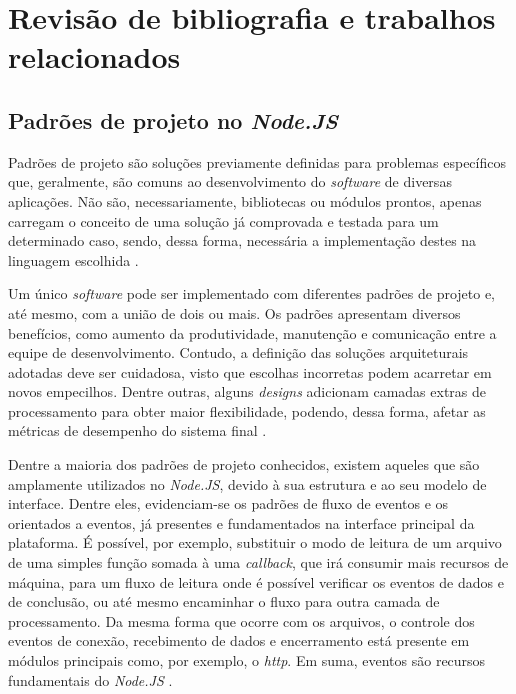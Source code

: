\documentclass[12pt]{article}
\begin{document}
\section{Revisão de bibliografia e trabalhos relacionados}

\subsection{Padrões de projeto no \textit{Node.JS}}

Padrões de projeto são soluções previamente definidas para problemas específicos que, geralmente,
são comuns ao desenvolvimento do \textit{software} de diversas aplicações. Não são, necessariamente, 
bibliotecas ou módulos prontos, apenas carregam o conceito de uma solução já comprovada e testada para um 
determinado caso, sendo, dessa forma, necessária a implementação destes na 
linguagem escolhida \cite[p. 13]{DIOGORESENDE}.

Um único \textit{software} pode ser implementado com diferentes padrões de projeto e, até mesmo, com a união
de dois ou mais. Os padrões apresentam diversos benefícios, como aumento da produtividade, manutenção e comunicação
entre a equipe de desenvolvimento. Contudo, a definição das soluções arquiteturais adotadas deve ser 
cuidadosa, visto que escolhas incorretas podem acarretar em novos empecilhos. Dentre outras, 
alguns \textit{designs} adicionam camadas extras de processamento para obter maior flexibilidade, podendo, dessa forma, 
afetar as métricas de desempenho do sistema final \cite[p. 13 - p. 14]{DIOGORESENDE}.

Dentre a maioria dos padrões de projeto conhecidos, existem aqueles que são amplamente utilizados no 
\textit{Node.JS}, devido à sua estrutura e ao seu modelo de interface. Dentre eles, evidenciam-se
os padrões de fluxo de eventos e os orientados a eventos, já presentes e fundamentados na interface principal 
da plataforma. É possível, por exemplo, substituir o modo de leitura de um arquivo de 
uma simples função somada à uma \textit{callback}, que irá consumir mais recursos de máquina, para um fluxo de 
leitura onde é possível verificar os eventos de dados e de conclusão, ou até mesmo encaminhar o fluxo para 
outra camada de processamento. Da mesma forma que ocorre com os arquivos, o controle dos eventos 
de conexão, recebimento de dados e encerramento está presente em módulos principais como, por exemplo, 
o \textit{http}. Em suma, eventos são recursos fundamentais do \textit{Node.JS} \cite[p. 15]{DIOGORESENDE}.
\end{document}
